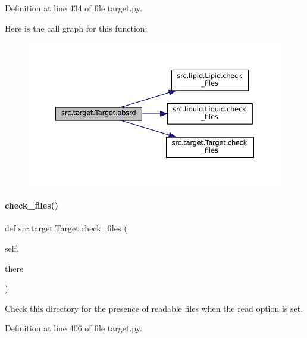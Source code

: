 Definition at line 434 of file target.\+py.

Here is the call graph for this function\+:
\nopagebreak
\begin{figure}[H]
\begin{center}
\leavevmode
\includegraphics[width=350pt]{classsrc_1_1target_1_1Target_ad4a6e0bee35444a8b2c8bc124aac3c46_cgraph}
\end{center}
\end{figure}
\mbox{\label{classsrc_1_1target_1_1Target_ab38c76271f96279624e9981bc365a082}} 
\paragraph{\texorpdfstring{check\+\_\+files()}{check\_files()}}
{\footnotesize\ttfamily def src.\+target.\+Target.\+check\+\_\+files (\begin{DoxyParamCaption}\item[{}]{self,  }\item[{}]{there }\end{DoxyParamCaption})}



Check this directory for the presence of readable files when the \textquotesingle{}read\textquotesingle{} option is set. 



Definition at line 406 of file target.\+py.

\mbox{\label{classsrc_1_1target_1_1Target_a8cdd102607c4ed610c0e1ec50e91452d}} 

